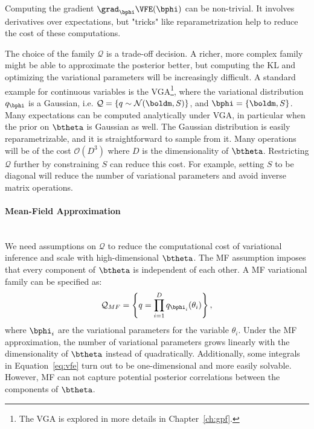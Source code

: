 Computing the gradient $\grad_{\bphi}\VFE(\bphi)$ can be non-trivial.
It involves derivatives over expectations, but "tricks" like reparametrization \cite{titsiasDoublyStochasticVariational} help to reduce the cost of these computations.

The choice of the family $\mathcal{Q}$ is a trade-off decision.
A richer, more complex family might be able to approximate the posterior better, but computing the \ac{KL} and optimizing the variational parameters will be increasingly difficult.
A standard example for continuous variables is the \ac{VGA}\footnote{The \ac{VGA} is explored in more details in Chapter~\ref{ch:gpf}.}, where the variational distribution $q_{\bphi}$ is a Gaussian, i.e. $\mathcal{Q} = \left\{q \sim \mathcal{N}(\boldm, S)\right\}$, and $\bphi = \{\boldm, S\}$.
Many expectations can be computed analytically under \ac{VGA}, in particular when the prior on $\btheta$ is Gaussian as well.
The Gaussian distribution is easily reparametrizable, and it is straightforward to sample from it.
Many operations will be of the cost $\mathcal{O}(D^3)$ where $D$ is the dimensionality of $\btheta$.
Restricting $\mathcal{Q}$ further by constraining $S$ can reduce this cost.
For example, setting $S$ to be diagonal will reduce the number of variational parameters and avoid inverse matrix operations.

\paragraph{Mean-Field Approximation}\mbox{}\\
We need assumptions on $\mathcal{Q}$ to reduce the computational cost of variational inference and scale with high-dimensional $\btheta$.
The \ac{MF} assumption imposes that every component of $\btheta$ is independent of each other.
A \ac{MF} variational family can be specified as:
\begin{align}
    \mathcal{Q}_{MF}= \left\{q = \prod_{i=1}^D q_{\bphi_i}(\theta_i)\right\},
\end{align}
where $\bphi_i$ are the variational parameters for the variable $\theta_i$.
Under the \ac{MF} approximation, the number of variational parameters grows linearly with the dimensionality of $\btheta$ instead of quadratically.
Additionally, some integrals in Equation~\eqref{eq:vfe} turn out to be one-dimensional and more easily solvable.
However, \ac{MF} can not capture potential posterior correlations between the components of $\btheta$.

